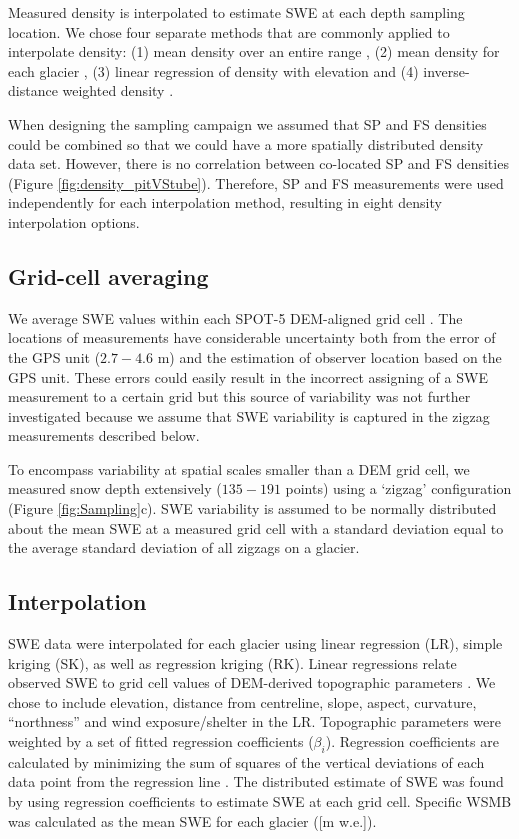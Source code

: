 \documentclass[twocolumn,letterpaper]{igs}
\begin{document}
Measured density is interpolated to estimate SWE at each depth sampling location. We chose four separate methods that are commonly applied to interpolate density: (1) mean density over an entire range \citep[e.g.][]{Cullen2017}, (2) mean density for each glacier \citep[e.g.][]{Elder1991, McGrath2015}, (3) linear regression of density with elevation \citep[e.g.][]{Elder1998, Molotch2005} and (4) inverse-distance weighted density \citep[e.g.][]{Molotch2005}. 

When designing the sampling campaign we assumed that SP and FS densities could be combined so that we could have a more spatially distributed density data set. However, there is no correlation between co-located SP and FS densities (Figure \ref{fig:density_pitVStube}). Therefore, SP and FS measurements were used independently for each interpolation method, resulting in eight density interpolation options. 

\subsection{Grid-cell averaging}

We average SWE values within each SPOT-5 DEM-aligned grid cell \citep{Korona2009}. The locations of measurements have considerable uncertainty both from the error of the GPS unit ($2.7 - 4.6$ m) and the estimation of observer location based on the GPS unit. These errors could easily result in the incorrect assigning of a SWE measurement to a certain grid but this source of variability was not further investigated because we assume that SWE variability is captured in the zigzag measurements described below.  

To encompass variability at spatial scales smaller than a DEM grid cell, we measured snow depth extensively ($135-191$ points) using a `zigzag' configuration (Figure \ref{fig:Sampling}c). SWE variability is assumed to be normally distributed about the mean SWE at a measured grid cell with a standard deviation equal to the average standard deviation of all zigzags on a glacier.

\subsection{Interpolation}

SWE data were interpolated for each glacier using linear regression (LR), simple kriging (SK), as well as regression kriging (RK). Linear regressions relate observed SWE to grid cell values of DEM-derived topographic parameters \citep{Davis1986}. We chose to include elevation, distance from centreline, slope, aspect, curvature, ``northness'' and wind exposure/shelter in the LR. Topographic parameters were weighted by a set of fitted regression coefficients ($\beta_i$). Regression coefficients are calculated by minimizing the sum of squares of the vertical deviations of each data point from the regression line \citep{Davis1986}. The distributed estimate of SWE was found by using regression coefficients to estimate SWE at each grid cell. Specific WSMB was calculated as the mean SWE for each glacier ([m w.e.]). 
\end{document}
